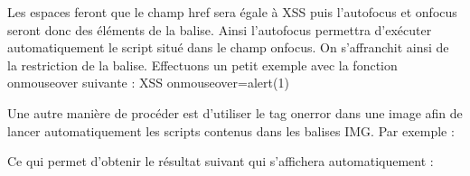 \documentclass{article}
\begin{document}
Les espaces feront que le champ href sera égale à XSS puis l'autofocus et onfocus seront donc des éléments de la balise. Ainsi l'autofocus permettra d'exécuter automatiquement le script situé dans le champ onfocus. On s'affranchit ainsi de la restriction de la balise. Effectuons un petit exemple avec la fonction onmouseover suivante : XSS onmouseover=alert(1)
\vspace{0.2cm}\\
\vspace{0.2cm}

Une autre manière de procéder est d'utiliser le tag onerror dans une image afin de lancer automatiquement les scripts contenus dans les balises IMG. Par exemple :
\vspace{0.2cm}\\
\vspace{0.2cm}

Ce qui permet d'obtenir le résultat suivant qui s'affichera automatiquement :
\vspace{0.2cm}\\
\vspace{0.2cm}
\end{document}
